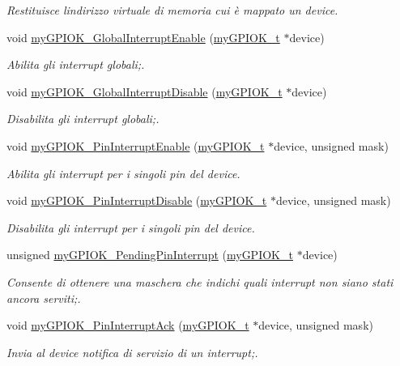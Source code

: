 \begin{DoxyCompactItemize}
\begin{DoxyCompactList}\small\item\em Restituisce l\textquotesingle{}indirizzo virtuale di memoria cui è mappato un device. \end{DoxyCompactList}\item 
void \hyperlink{group___linux-_driver_gaf8da20aabceb02b9ea8132228c973368}{my\+G\+P\+I\+O\+K\+\_\+\+Global\+Interrupt\+Enable} (\hyperlink{structmy_g_p_i_o_k__t}{my\+G\+P\+I\+O\+K\+\_\+t} $\ast$device)
\begin{DoxyCompactList}\small\item\em Abilita gli interrupt globali;. \end{DoxyCompactList}\item 
void \hyperlink{group___linux-_driver_gad9275880dc4941d3d0ae93c45bf4cf79}{my\+G\+P\+I\+O\+K\+\_\+\+Global\+Interrupt\+Disable} (\hyperlink{structmy_g_p_i_o_k__t}{my\+G\+P\+I\+O\+K\+\_\+t} $\ast$device)
\begin{DoxyCompactList}\small\item\em Disabilita gli interrupt globali;. \end{DoxyCompactList}\item 
void \hyperlink{group___linux-_driver_gac63adbb81dcfa905341a9ea0bc6283b6}{my\+G\+P\+I\+O\+K\+\_\+\+Pin\+Interrupt\+Enable} (\hyperlink{structmy_g_p_i_o_k__t}{my\+G\+P\+I\+O\+K\+\_\+t} $\ast$device, unsigned mask)
\begin{DoxyCompactList}\small\item\em Abilita gli interrupt per i singoli pin del device. \end{DoxyCompactList}\item 
void \hyperlink{group___linux-_driver_gad600864a578b08a526f8955d3e9f6ca0}{my\+G\+P\+I\+O\+K\+\_\+\+Pin\+Interrupt\+Disable} (\hyperlink{structmy_g_p_i_o_k__t}{my\+G\+P\+I\+O\+K\+\_\+t} $\ast$device, unsigned mask)
\begin{DoxyCompactList}\small\item\em Disabilita gli interrupt per i singoli pin del device. \end{DoxyCompactList}\item 
unsigned \hyperlink{group___linux-_driver_ga3c78c03314722cfa7f32503ede4c29c4}{my\+G\+P\+I\+O\+K\+\_\+\+Pending\+Pin\+Interrupt} (\hyperlink{structmy_g_p_i_o_k__t}{my\+G\+P\+I\+O\+K\+\_\+t} $\ast$device)
\begin{DoxyCompactList}\small\item\em Consente di ottenere una maschera che indichi quali interrupt non siano stati ancora serviti;. \end{DoxyCompactList}\item 
void \hyperlink{group___linux-_driver_ga3c0591dacf65607a7e31a0bf9c9011ae}{my\+G\+P\+I\+O\+K\+\_\+\+Pin\+Interrupt\+Ack} (\hyperlink{structmy_g_p_i_o_k__t}{my\+G\+P\+I\+O\+K\+\_\+t} $\ast$device, unsigned mask)
\begin{DoxyCompactList}\small\item\em Invia al device notifica di servizio di un interrupt;. \end{DoxyCompactList}\end{DoxyCompactItemize}
